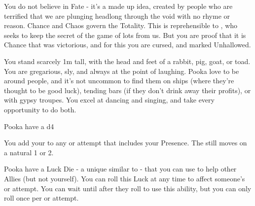 

    
  You do not believe in Fate - it's a made up idea, created by people who are terrified that we are plunging headlong through the void with no rhyme or reason.  Chance and Chaos govern the Totality.  This is reprehensible to \TheAuthority, who seeks to keep the secret of the game of lots from us.  But you are proof that it is Chance that was victorious, and for this you are cursed, and marked Unhallowed.

  You stand scarcely 1m tall, with the head and feet of a rabbit, pig, goat, or toad.  You are gregarious, sly, and always at the point of laughing.  Pooka love to be around people, and it's not uncommon to find them on ships (where they're thought to be good luck), tending bars (if they don't drink away their profits), or with gypsy troupes.  You excel at dancing and singing, and take every opportunity to do both.

  \cbreak




Pooka have a d4 \FLESH


  You add your \LVL to any \RO or \RB attempt that includes your Presence.  The \UD still moves \DCDOWN on a natural 1 or 2.


  Pooka have a Luck Die - a unique \UD similar to  - that you can use to help other Allies (but not yourself).  You can roll this Luck \UD at any time to affect someone's \RO or \RB attempt. You can wait until after they roll to use this ability, but you can only roll once per \RO or \RB attempt.


